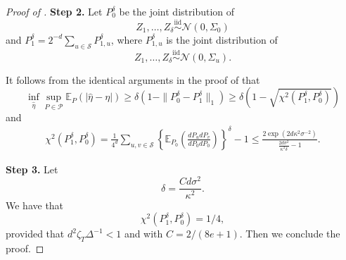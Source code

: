\documentclass[twoside]{article}
\begin{document}
\begin{proof}[Proof of ]
\medskip
\noindent \textbf{Step 2.}  Let $P_0^{\delta}$ be the joint distribution of 
	\[
		Z_1, \ldots, Z_{\delta} \stackrel{\mbox{iid}}{\sim} \mathcal{N}(0, \Sigma_0)
	\]	
	and $P_1^{\delta} = 2^{-d} \sum_{u \in \mathcal{S}} P_{1, u}^{\delta}$, where $P^{\delta}_{1, u}$ is the joint distribution of 
	\[
		Z_1, \ldots, Z_{\delta} \stackrel{\mbox{iid}}{\sim} \mathcal{N}(0, \Sigma_u).  
	\]

It follows from the identical arguments in the proof of  that
	\[
		\inf_{\widehat{\eta}} \sup_{P \in \mathcal{P}} \mathbb{E}_P(|\widehat{\eta} - \eta|) \geq \delta (1 - \|P_0^{\delta} - P_1^{\delta}\|_1) \geq \delta (1 - \sqrt{\chi^2(P_1^{\delta}, P_0^{\delta})})
	\]
	and
	\begin{align*}
		\chi^2(P_1^{\delta}, P_0^{\delta}) = \frac{1}{4^d} \sum_{u, v \in \mathcal{S}} \left\{\mathbb{E}_{P_0} \left(\frac{dP_u dP_v}{dP_0 dP_0}\right)\right\}^{\delta} - 1 \leq \frac{2\exp(2d\kappa^2\sigma^{-2})}{\frac{2d\sigma^2}{\kappa^2 \delta} - 1}.
	\end{align*}

\medskip 
\noindent \textbf{Step 3.}  Let 
	\[
		\delta = \frac{Cd\sigma^2}{\kappa^2}. 
	\]
	We have that
	\[
		\chi^2(P_1^{\delta}, P_0^{\delta}) = 1/4,
	\]
	provided that $d^2\zeta_T\Delta^{-1} < 1$ and with $C = 2/(8e+1)$.  Then we conclude the proof.
\end{proof}






\end{document}
